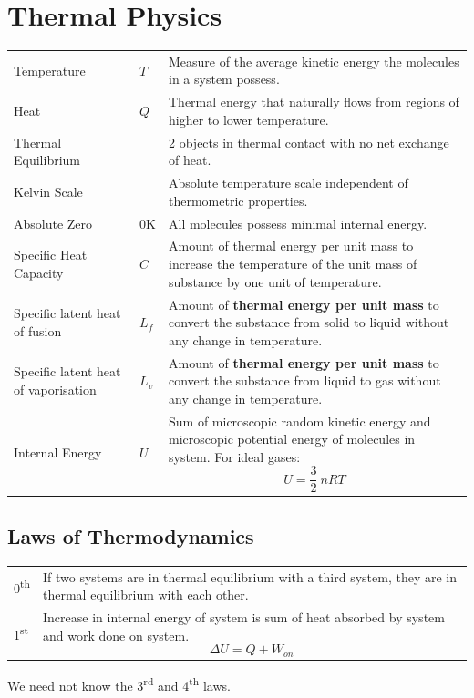 \documentclass[a4paper,11pt]{article}
\begin{document}
	\section{Thermal Physics}
		\begin{center}
			\renewcommand{\arraystretch}{1.2}
			\begin{tabular}{@{} l l p{8.5cm} @{}}
				\toprule
				Temperature & $T$ & Measure of the average kinetic energy the molecules in a system possess. \\
				Heat & $Q$ & Thermal energy that naturally flows from regions of higher to lower temperature. \\
				Thermal Equilibrium & & 2 objects in thermal contact with no net exchange of heat. \\
				Kelvin Scale & & Absolute temperature scale independent of thermometric properties. \\
				Absolute Zero & 0K & All molecules possess minimal internal energy. \\
				Specific Heat Capacity & $C$ & Amount of thermal energy per unit mass to increase the temperature of the unit mass of substance by one unit of temperature. \\
				Specific latent heat of fusion & $L_f$ & Amount of \textbf{thermal energy per unit mass} to convert the substance from solid to liquid without any change in temperature. \\
				Specific latent heat of vaporisation & $L_v$ & Amount of \textbf{thermal energy per unit mass} to convert the substance from liquid to gas without any change in temperature. \\
				Internal Energy & $U$ & Sum of microscopic random kinetic energy and microscopic potential energy of molecules in system. For ideal gases: $$U=\frac{3}{2}~nRT$$ \vspace*{-\baselineskip} \\ 
				\bottomrule
			\end{tabular}
		\end{center}
		\subsection{Laws of Thermodynamics}
			\begin{center}
				\renewcommand{\arraystretch}{1.2}
				\begin{tabular}{@{} l p{14cm} @{}}
					\toprule
					0\textsuperscript{th} & If two systems are in thermal equilibrium with a third system, they are in thermal equilibrium with each other. \\
					1\textsuperscript{st} & Increase in internal energy of system is sum of heat absorbed by system and work done on system. $$\Delta U = Q + W_{on}$$ \vspace*{-\baselineskip} \\
					\bottomrule
				\end{tabular}
			\end{center}
			We need not know the 3\textsuperscript{rd} and 4\textsuperscript{th} laws.
		\newpage
\end{document}
